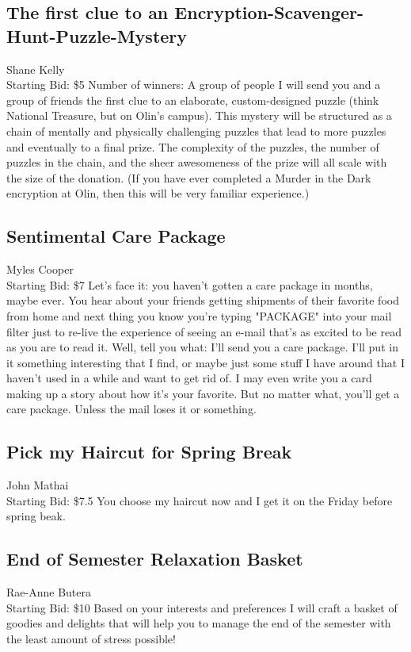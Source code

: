 \documentclass[11pt]{article}
\begin{document}
\subsection{The first clue to an Encryption-Scavenger-Hunt-Puzzle-Mystery}
Shane Kelly
\\
Starting Bid: \$5
\newline
Number of winners: A group of people
\newline
I will send you and a group of friends the first clue to an elaborate, custom-designed puzzle (think National Treasure, but on Olin's campus). This mystery will be structured as a chain of mentally and physically challenging puzzles that lead to more puzzles and eventually to a final prize. The complexity of the puzzles, the number of puzzles in the chain, and the sheer awesomeness of the prize will all scale with the size of the donation. (If you have ever completed a Murder in the Dark encryption at Olin, then this will be very familiar experience.)
\subsection{Sentimental Care Package}
Myles Cooper
\\
Starting Bid: \$7
\newline
Let's face it: you haven't gotten a care package in months, maybe ever. You hear about your friends getting shipments of their favorite food from home and next thing you know you're typing "PACKAGE" into your mail filter just to re-live the experience of seeing an e-mail that's as excited to be read as you are to read it. Well, tell you what: I'll send you a care package. I'll put in it something interesting that I find, or maybe just some stuff I have around that I haven't used in a while and want to get rid of. I may even write you a card making up a story about how it's your favorite. But no matter what, you'll get a care package. Unless the mail loses it or something.
\subsection{Pick my Haircut for Spring Break}
John Mathai
\\
Starting Bid: \$7.5
\newline
You choose my haircut now and I get it on the Friday before spring beak.
\subsection{End of Semester Relaxation Basket}
Rae-Anne Butera
\\
Starting Bid: \$10
\newline
Based on your interests and preferences I will craft a basket of goodies and delights that will help you to manage the end of the semester with the least amount of stress possible!
\end{document}
